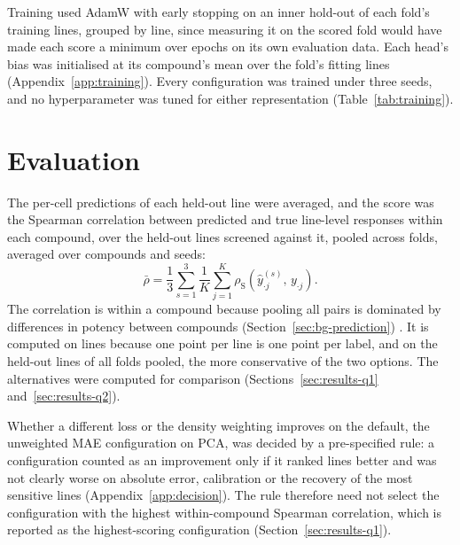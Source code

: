 Training used AdamW with early stopping on an inner
hold-out of each fold's training lines, grouped by line, since measuring it on the scored fold would
have made each score a minimum over epochs on its own evaluation data. Each head's bias was initialised at its compound's mean over the fold's fitting lines
(Appendix~\ref{app:training}). Every configuration was trained under three seeds, and no hyperparameter
was tuned for either representation (Table~\ref{tab:training}).

\section{Evaluation}
\label{sec:evaluation}

The per-cell predictions of each held-out line were averaged, and the score was the Spearman
correlation between predicted and true line-level responses within each compound,
over the held-out lines screened against it, pooled across folds, averaged over compounds and seeds:
\begin{equation}
  \bar\rho = \frac{1}{3}\sum_{s=1}^{3}\frac{1}{K}\sum_{j=1}^{K}
  \rho_{\mathrm{S}}\!\left(\hat y^{(s)}_{\cdot j},\, y_{\cdot j}\right).
  \label{eq:metric}
\end{equation}
The correlation is within a compound because pooling all pairs is dominated by differences in potency
between compounds (Section~\ref{sec:bg-prediction}) \cite{dreval}. It is computed on lines because one
point per line is one point per label, and on the held-out lines of all folds pooled, the more
conservative of the two options. The alternatives were computed for comparison
(Sections~\ref{sec:results-q1} and~\ref{sec:results-q2}).

Whether a different loss or the density weighting improves on the default, the unweighted MAE
configuration on PCA, was decided by a pre-specified rule: a configuration counted as an
improvement only if it ranked lines better and was not clearly worse on absolute error, calibration or
the recovery of the most sensitive lines (Appendix~\ref{app:decision}).
The rule therefore need not select the configuration with the highest within-compound Spearman correlation, which is reported as
the highest-scoring configuration (Section~\ref{sec:results-q1}).

